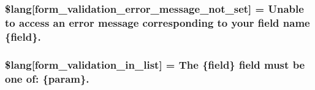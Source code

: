 \subsubsection[{\$lang}]{\setlength{\rightskip}{0pt plus 5cm}\$lang\mbox{[}\textquotesingle{}form\+\_\+validation\+\_\+error\+\_\+message\+\_\+not\+\_\+set\textquotesingle{}\mbox{]} = \textquotesingle{}Unable to access an error message corresponding to your field name \{field\}.\textquotesingle{}}\label{system_2language_2english_2form__validation__lang_8php_ad29f9046f70e4b900cf5283143de0618}
\hypertarget{system_2language_2english_2form__validation__lang_8php_ae48fb4c900d50c05f0939f9fec1262a2}{}
\subsubsection[{\$lang}]{\setlength{\rightskip}{0pt plus 5cm}\$lang\mbox{[}\textquotesingle{}form\+\_\+validation\+\_\+in\+\_\+list\textquotesingle{}\mbox{]} = \textquotesingle{}The \{field\} field must be one of\+: \{param\}.\textquotesingle{}}\label{system_2language_2english_2form__validation__lang_8php_ae48fb4c900d50c05f0939f9fec1262a2}
